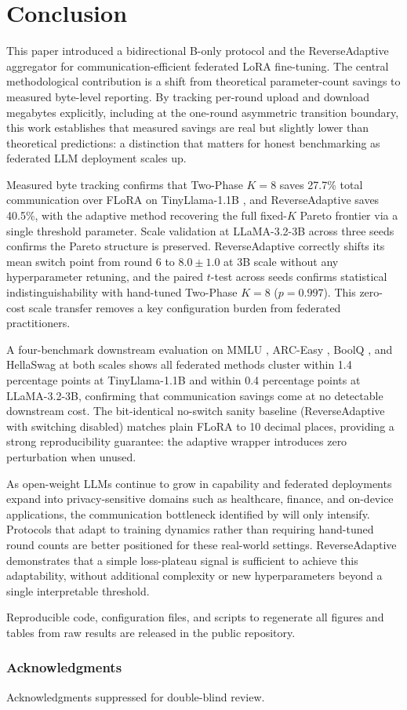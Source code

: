 \section{Conclusion}
\label{sec:conclusion}

This paper introduced a bidirectional B-only protocol and the ReverseAdaptive aggregator for communication-efficient federated LoRA fine-tuning. The central methodological contribution is a shift from theoretical parameter-count savings to measured byte-level reporting. By tracking per-round upload and download megabytes explicitly, including at the one-round asymmetric transition boundary, this work establishes that measured savings are real but slightly lower than theoretical predictions: a distinction that matters for honest benchmarking as federated LLM deployment scales up.

Measured byte tracking confirms that Two-Phase $K{=}8$ saves 27.7\% total communication over FLoRA \citep{wang2024flora} on TinyLlama-1.1B \citep{zhang2024tinyllama}, and ReverseAdaptive saves 40.5\%, with the adaptive method recovering the full fixed-$K$ Pareto frontier via a single threshold parameter. Scale validation at LLaMA-3.2-3B \citep{dubey2024llama3} across three seeds confirms the Pareto structure is preserved. ReverseAdaptive correctly shifts its mean switch point from round 6 to $8.0 \pm 1.0$ at 3B scale without any hyperparameter retuning, and the paired $t$-test across seeds confirms statistical indistinguishability with hand-tuned Two-Phase $K{=}8$ ($p = 0.997$). This zero-cost scale transfer removes a key configuration burden from federated practitioners.

A four-benchmark downstream evaluation on MMLU \citep{hendrycks2020measuring}, ARC-Easy \citep{clark2018arc}, BoolQ \citep{clark2019boolq}, and HellaSwag \citep{zellers2019hellaswag} at both scales shows all federated methods cluster within 1.4 percentage points at TinyLlama-1.1B and within 0.4 percentage points at LLaMA-3.2-3B, confirming that communication savings come at no detectable downstream cost. The bit-identical no-switch sanity baseline (ReverseAdaptive with switching disabled) matches plain FLoRA to 10 decimal places, providing a strong reproducibility guarantee: the adaptive wrapper introduces zero perturbation when unused.

As open-weight LLMs \citep{dubey2024llama3,zhang2024tinyllama} continue to grow in capability and federated deployments expand into privacy-sensitive domains such as healthcare, finance, and on-device applications, the communication bottleneck identified by \citet{kairouz2021advances} will only intensify. Protocols that adapt to training dynamics rather than requiring hand-tuned round counts are better positioned for these real-world settings. ReverseAdaptive demonstrates that a simple loss-plateau signal is sufficient to achieve this adaptability, without additional complexity or new hyperparameters beyond a single interpretable threshold.

Reproducible code, configuration files, and scripts to regenerate all figures and tables from raw results are released in the public repository.

\subsubsection*{Acknowledgments}
Acknowledgments suppressed for double-blind review.
